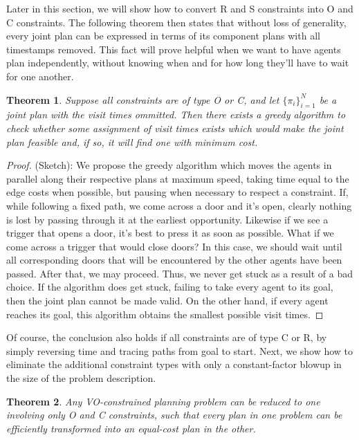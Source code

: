 \documentclass[letterpaper]{article}
\newtheorem{thm}{Theorem}
\begin{document}
Later in this section, we will show how to convert R and S constraints into O and C constraints. The following theorem then states that without loss of generality, every joint plan can be expressed in terms of its component plans with all timestamps removed. This fact will prove helpful when we want to have agents plan independently, without knowing when and for how long they'll have to wait for one another.

\begin{thm}
\label{thm:greedy}
Suppose all constraints are of type O or C, and let $\{\pi_i\}_{i=1}^N$ be a joint plan with the visit times ommitted. Then there exists a greedy algorithm to check whether some assignment of visit times exists which would make the joint plan feasible and, if so, it will find one with minimum cost.
\end{thm} 

\begin{proof}
(Sketch): We propose the greedy algorithm which moves the agents in parallel along their respective plans at maximum speed, taking time equal to the edge costs when possible, but pausing when necessary to respect a constraint. If, while following a fixed path, we come across a door and it's open, clearly nothing is lost by passing through it at the earliest opportunity. Likewise if we see a trigger that opens a door, it's best to press it as soon as possible. What if we come across a trigger that would close doors? In this case, we should wait until all corresponding doors that will be encountered by the other agents have been passed. After that, we may proceed. Thus, we never get stuck as a result of a bad choice. If the algorithm does get stuck, failing to take every agent to its goal, then the joint plan cannot be made valid. On the other hand, if every agent reaches its goal, this algorithm obtains the smallest possible visit times.
\end{proof}

Of course, the conclusion also holds if all constraints are of type C or R, by simply reversing time and tracing paths from goal to start. Next, we show how to eliminate the additional constraint types with only a constant-factor blowup in the size of the problem description.

\begin{thm}
\label{thm:OC}
Any VO-constrained planning problem can be reduced to one involving only O and C constraints, such that every plan in one problem can be efficiently transformed into an equal-cost plan in the other.
\end{thm}
\end{document}
